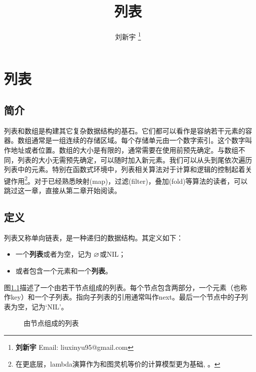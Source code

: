 \documentclass[b5paper]{ctexart}
\begin{document}
\title{列表}

\author{刘新宇
\thanks{{\bfseries 刘新宇} \newline
  Email: liuxinyu95@gmail.com \newline}
  }

\maketitle
\fi


\ifx\wholebook\relax
\chapter{列表}
\fi

\section{简介}
\label{introduction}

列表和数组是构建其它复杂数据结构的基石。它们都可以看作是容纳若干元素的容器。数组通常是一组连续的存储区域。每个存储单元由一个数字索引。这个数字叫作地址或者位置。数组的大小是有限的，通常需要在使用前预先确定。与数组不同，列表的大小无需预先确定，可以随时加入新元素。我们可以从头到尾依次遍历列表中的元素。特别在函数式环境中，列表相关算法对于计算和逻辑的控制起着关键作用\footnote{在更底层，lambda演算作为和图灵机等价的计算模型更为基础\cite{mittype}, \cite{unplugged}。}。对于已经熟悉映射(map)，过滤(filter)，叠加(fold)等算法的读者，可以跳过这一章，直接从第二章开始阅读。

\section{定义}

列表又称单向链表，是一种递归的数据结构。其定义如下：

\begin{itemize}
\item 一个\textbf{列表}或者为空，记为 $\varnothing$或NIL；
\item 或者包含一个元素和一个\textbf{列表}。
\end{itemize}

图\ref{fig:list-example}描述了一个由若干节点组成的列表。每个节点包含两部分，一个元素（也称作key）和一个子列表。指向子列表的引用通常叫作next。最后一个节点中的子列表为空，记为‘NIL’。

\begin{figure}[htbp]
  \centering
  \caption{由节点组成的列表}
  \label{fig:list-example}
\end{figure}
\end{document}
